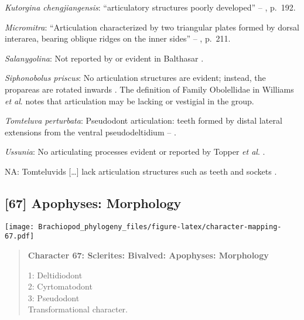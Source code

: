 \documentclass[openany]{book}
\theoremstyle{definition}
\theoremstyle{definition}
\theoremstyle{definition}
\theoremstyle{remark}
\begin{document}
\hypertarget{Kutorgina_chengjiangensis-coding-66}{}
\emph{Kutorgina chengjiangensis}: ``articulatory structures poorly
developed'' -- \citet{Williams2000LinguliformeaCraniiformea}, p.~192.

\hypertarget{Micromitra-coding-66}{}
\emph{Micromitra}: ``Articulation characterized by two triangular plates
formed by dorsal interarea, bearing oblique ridges on the inner sides''
-- \citet{Williams2000LinguliformeaCraniiformea}, p.~211.

\hypertarget{Salanygolina-coding-66}{}
\emph{Salanygolina}: Not reported by or evident in Balthasar
\citeyearpar{Balthasar2004Shellstructure}.

\hypertarget{Siphonobolus_priscus-coding-66}{}
\emph{Siphonobolus priscus}: No articulation structures are evident;
instead, the propareas are rotated inwards
\citep{Balthasar2008iMummpikia}. The definition of Family Obolellidae in
Williams \emph{et al}.
\citeyearpar{Williams2000LinguliformeaCraniiformea} notes that
articulation may be lacking or vestigial in the group.

\hypertarget{Tomteluva_perturbata-coding-66}{}
\emph{Tomteluva perturbata}: Pseudodont articulation: teeth formed by
distal lateral extensions from the ventral pseudodeltidium --
\citet{Holmer2018Evolutionarysignificance}.

\hypertarget{Ussunia-coding-66}{}
\emph{Ussunia}: No articulating processes evident or reported by Topper
\emph{et al}. \citeyearpar{Topper2013Reappraisalof}.

\hypertarget{NA-coding-66}{}
NA: Tomteluvids {[}\ldots{}{]} lack articulation structures such as
teeth and sockets \citep{Streng2016Anew}.

\subsection*{{[}67{]} Apophyses: Morphology}\label{apophyses-morphology}

\texttt{[image: Brachiopod\_phylogeny\_files/figure-latex/character-mapping-67.pdf]}

\begin{quote}
\textbf{Character 67: Sclerites: Bivalved: Apophyses: Morphology}

1: Deltidiodont\\
2: Cyrtomatodont\\
3: Pseudodont\\
Transformational character.
\end{quote}
\end{document}
